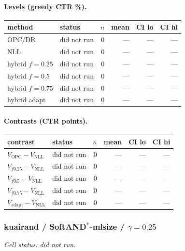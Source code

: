 \documentclass[10pt,a4paper]{article}
\begin{document}
\paragraph{Levels (greedy CTR \%).}
{\centering\small\begin{tabular}{llrrrr}
\toprule method & status & $n$ & mean & CI lo & CI hi \\
\midrule
OPC/DR & did not run & 0 & --- & --- & --- \\
NLL & did not run & 0 & --- & --- & --- \\
hybrid $f{=}0.25$ & did not run & 0 & --- & --- & --- \\
hybrid $f{=}0.5$ & did not run & 0 & --- & --- & --- \\
hybrid $f{=}0.75$ & did not run & 0 & --- & --- & --- \\
hybrid adapt & did not run & 0 & --- & --- & --- \\
\bottomrule\end{tabular}\par}
\paragraph{Contrasts (CTR points).}
{\centering\small\begin{tabular}{llrrrr}
\toprule contrast & status & $n$ & mean & CI lo & CI hi \\
\midrule
$V_{\mathrm{OPC}}-V_{\mathrm{NLL}}$ & did not run & 0 & --- & --- & --- \\
$V_{f0.25}-V_{\mathrm{NLL}}$ & did not run & 0 & --- & --- & --- \\
$V_{f0.5}-V_{\mathrm{NLL}}$ & did not run & 0 & --- & --- & --- \\
$V_{f0.75}-V_{\mathrm{NLL}}$ & did not run & 0 & --- & --- & --- \\
$V_{\mathrm{adapt}}-V_{\mathrm{NLL}}$ & did not run & 0 & --- & --- & --- \\
\bottomrule\end{tabular}\par}
\bigskip
\subsubsection{kuairand / SoftAND$^*$-mlsize / $\gamma=0.25$}
\emph{Cell status: did not run}.
\end{document}
